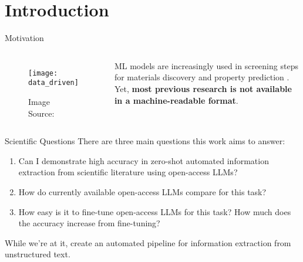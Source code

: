 \section{Introduction}

\begin{frame}[c]{Motivation}
    \begin{columns}
    \begin{figure}
        \centering
    \texttt{[image: data\_driven]}
    \caption{
    Image Source: \cite{himanen_datadriven_2019}
    }
    \end{figure}
    \large
    \gls{ML} models are increasingly used in screening steps for materials discovery and property prediction \cite{saal_machine_2020, luo_mof_2022, choudhary_recent_2022}.
    Yet, \textbf{most previous research is not available in a machine-readable format}.
\end{columns}
\end{frame}

\begin{frame}[c]{Scientific Questions}
    \large
    There are three main questions this work aims to answer:
    \begin{enumerate}[<+(1)->]
        \item Can I demonstrate high accuracy in zero-shot automated information extraction from scientific literature using open-access \glspl{LLM}?
        \item How do currently available open-access \glspl{LLM} compare for this task?
        \item How easy is it to fine-tune open-access \glspl{LLM} for this task? How much does the accuracy increase from fine-tuning?
    \end{enumerate}
    \pause
    \vfill
    While we're at it, create an automated pipeline for information extraction from unstructured text.
\end{frame}
